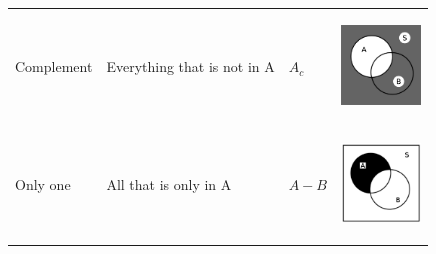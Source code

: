 \begin{center}
\begin{xtabular*}{\mytablewidth}[t]{|p{10\mystarwidth}|p{10\mystarwidth}|p{10\mystarwidth}|p{10\mystarwidth}|}
        Complement &
        Everything that is not in A &
        ${A}_{c}$ &
    \setcounter{subfigure}{0}
\label{m39373*uid14567}
    \begin{center}
    \label{m39373*uid14567!!!underscore!!!media}\label{m39373*uid14567!!!underscore!!!printimage}\includegraphics[width=80px]{col11306.imgs/m39373_complement.png} %
      \vspace{2pt}
    \vspace{.1in}
    \end{center}    %
     \tabularnewline{}
        Only one &
        All that is only in A &
        $A-B$ &
    \setcounter{subfigure}{0}
\label{m39373*uid14767}
    \begin{center}
    \label{m39373*uid14767!!!underscore!!!media}\label{m39373*uid14767!!!underscore!!!printimage}\includegraphics[width=80px]{col11306.imgs/m39373_a-b.png} %

\end{center}
\end{xtabular*}
\end{center}
